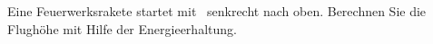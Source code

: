 Eine Feuerwerksrakete startet mit \vrO\ senkrecht nach oben. Berechnen Sie die Flughöhe mit Hilfe der Energieerhaltung.
